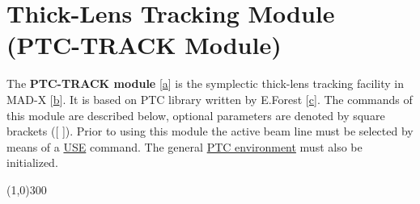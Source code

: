 

% 
% 




   

\section{Thick-Lens Tracking Module 
\\
  (PTC-TRACK Module)}


 The \textbf{PTC-TRACK module }[\hyperlink{V._Kapin}{a}] is the symplectic 
 thick-lens tracking facility in MAD-X [\hyperlink{F._Schmidt}{b}]. It is based 
 on PTC library written by E.Forest [\hyperlink{E._Forest}{c}]. The 
 commands of this module are described below, optional parameters are 
 denoted by square brackets ([ ]). Prior to using this module 
 the active beam line must be selected by means of a
 \href{../control/general.html#use}{USE} command. 
 The general \href{../ptc_general/ptc_general.html}{PTC 
 environment} must also be initialized. 

\line(1,0){300}

